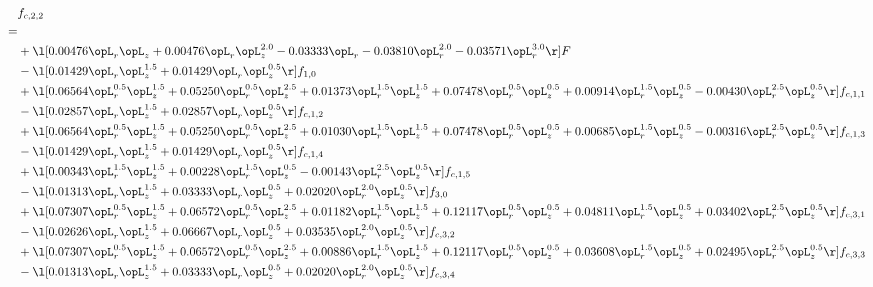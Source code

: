 \begin{alignat}{2} 
\label{eq:f_22_1} 
& f_{c,2,2} \nonumber \\ 
 = \\ 
& + \l[  0.00476 \opL_r \opL_z +  0.00476 \opL_r \opL_z^{2.0}   -0.03333 \opL_r   -0.03810 \opL_r^{2.0}   -0.03571 \opL_r^{3.0}  \r] F \nonumber \\ 
& - \l[  0.01429 \opL_r \opL_z^{1.5} +  0.01429 \opL_r \opL_z^{0.5}  \r] f_{1,0} \nonumber \\ 
& + \l[  0.06564 \opL_r^{0.5} \opL_z^{1.5} +  0.05250 \opL_r^{0.5} \opL_z^{2.5} +  0.01373 \opL_r^{1.5} \opL_z^{1.5} +  0.07478 \opL_r^{0.5} \opL_z^{0.5} +  0.00914 \opL_r^{1.5} \opL_z^{0.5}   -0.00430 \opL_r^{2.5} \opL_z^{0.5}  \r] f_{c,1,1} \nonumber \\ 
& - \l[  0.02857 \opL_r \opL_z^{1.5} +  0.02857 \opL_r \opL_z^{0.5}  \r] f_{c,1,2} \nonumber \\ 
& + \l[  0.06564 \opL_r^{0.5} \opL_z^{1.5} +  0.05250 \opL_r^{0.5} \opL_z^{2.5} +  0.01030 \opL_r^{1.5} \opL_z^{1.5} +  0.07478 \opL_r^{0.5} \opL_z^{0.5} +  0.00685 \opL_r^{1.5} \opL_z^{0.5}   -0.00316 \opL_r^{2.5} \opL_z^{0.5}  \r] f_{c,1,3} \nonumber \\ 
& - \l[  0.01429 \opL_r \opL_z^{1.5} +  0.01429 \opL_r \opL_z^{0.5}  \r] f_{c,1,4} \nonumber \\ 
& + \l[  0.00343 \opL_r^{1.5} \opL_z^{1.5} +  0.00228 \opL_r^{1.5} \opL_z^{0.5}   -0.00143 \opL_r^{2.5} \opL_z^{0.5}  \r] f_{c,1,5} \nonumber \\ 
& - \l[  0.01313 \opL_r \opL_z^{1.5} +  0.03333 \opL_r \opL_z^{0.5} +  0.02020 \opL_r^{2.0} \opL_z^{0.5}  \r] f_{3,0} \nonumber \\ 
& + \l[  0.07307 \opL_r^{0.5} \opL_z^{1.5} +  0.06572 \opL_r^{0.5} \opL_z^{2.5} +  0.01182 \opL_r^{1.5} \opL_z^{1.5} +  0.12117 \opL_r^{0.5} \opL_z^{0.5} +  0.04811 \opL_r^{1.5} \opL_z^{0.5} +  0.03402 \opL_r^{2.5} \opL_z^{0.5}  \r] f_{c,3,1} \nonumber \\ 
& - \l[  0.02626 \opL_r \opL_z^{1.5} +  0.06667 \opL_r \opL_z^{0.5} +  0.03535 \opL_r^{2.0} \opL_z^{0.5}  \r] f_{c,3,2} \nonumber \\ 
& + \l[  0.07307 \opL_r^{0.5} \opL_z^{1.5} +  0.06572 \opL_r^{0.5} \opL_z^{2.5} +  0.00886 \opL_r^{1.5} \opL_z^{1.5} +  0.12117 \opL_r^{0.5} \opL_z^{0.5} +  0.03608 \opL_r^{1.5} \opL_z^{0.5} +  0.02495 \opL_r^{2.5} \opL_z^{0.5}  \r] f_{c,3,3} \nonumber \\ 
& - \l[  0.01313 \opL_r \opL_z^{1.5} +  0.03333 \opL_r \opL_z^{0.5} +  0.02020 \opL_r^{2.0} \opL_z^{0.5}  \r] f_{c,3,4} \nonumber \\ 

\end{alignat}
